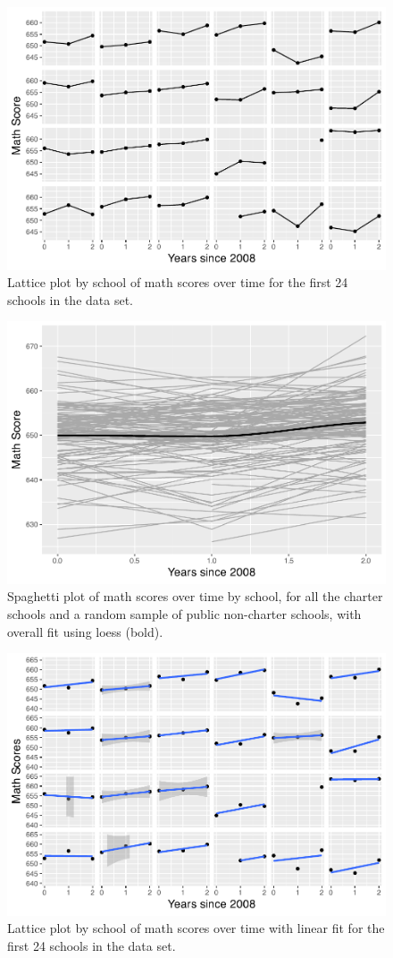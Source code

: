\documentclass[
]{krantz}
\begin{document}
\begin{figure}

{\centering \includegraphics[width=0.6\linewidth]{bookdown-BeyondMLR_files/figure-latex/lon-lat1-1} 

}

\caption{Lattice plot by school of math scores over time for the first 24 schools in the data set.}\label{fig:lon-lat1}
\end{figure}

\begin{figure}

{\centering \includegraphics[width=0.6\linewidth]{bookdown-BeyondMLR_files/figure-latex/lon-spag1-1} 

}

\caption{ Spaghetti plot of math scores over time by school, for all the charter schools and a random sample of public non-charter schools, with overall fit using loess (bold).}\label{fig:lon-spag1}
\end{figure}

\begin{figure}

{\centering \includegraphics[width=0.6\linewidth]{bookdown-BeyondMLR_files/figure-latex/lon-lat2-1} 

}

\caption{ Lattice plot by school of math scores over time with linear fit for the first 24 schools in the data set.}\label{fig:lon-lat2}
\end{figure}
\end{document}
